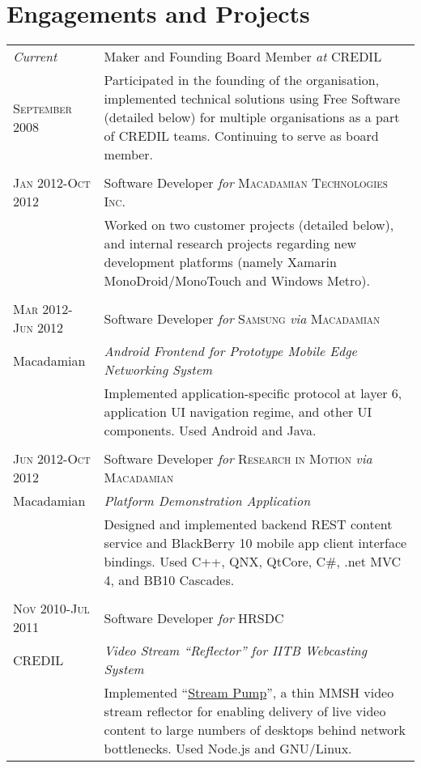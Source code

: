 \documentclass[letterpaper,10pt]{article}
\begin{document}
\section{Engagements and Projects}
\begin{longtable}{p{3cm}|p{12cm}}
  \emph{Current} & Maker and Founding Board Member \emph{at} \textsc{CREDIL} \\
  \textsc{September 2008} & \footnotesize{Participated in the founding of the organisation, implemented technical solutions using Free Software (detailed below) for multiple organisations as a part of CREDIL teams.  Continuing to serve as board member.} \\
\multicolumn{2}{c}{} \\
  \textsc{Jan 2012-Oct 2012} & Software Developer \emph{for} \textsc{Macadamian Technologies Inc.} \\
   & \footnotesize{Worked on two customer projects (detailed below), and internal research projects regarding new development platforms (namely Xamarin MonoDroid/MonoTouch and Windows Metro).} \\
\multicolumn{2}{c}{} \\
  \textsc{Mar 2012-Jun 2012} & Software Developer \emph{for} \textsc{Samsung} \emph{via} \textsc{Macadamian} \\
  \tiny{Macadamian} & \emph{Android Frontend for Prototype Mobile Edge Networking System} \\
   & \footnotesize{Implemented application-specific protocol at layer 6, application UI navigation regime, and other UI components.  Used Android and Java.} \\
\multicolumn{2}{c}{} \\
  \textsc{Jun 2012-Oct 2012} & Software Developer \emph{for} \textsc{Research in Motion} \emph{via} \textsc{Macadamian} \\
  \tiny{Macadamian} & \emph{Platform Demonstration Application} \\
   & \footnotesize{Designed and implemented backend REST content service and BlackBerry 10 mobile app client interface bindings.  Used C++, QNX, QtCore, C\#, .net MVC 4, and BB10 Cascades.} \\
\pagebreak
\multicolumn{2}{c}{} \\
  \textsc{Nov 2010-Jul 2011} & Software Developer \emph{for} \textsc{HRSDC} \\
  \tiny{CREDIL} & \emph{Video Stream ``Reflector'' for IITB Webcasting System} \\
   & \footnotesize{Implemented ``{\href{https://github.com/orospakr/stream-pump}{Stream Pump}}'', a thin MMSH video stream reflector for enabling delivery of live video content to large numbers of desktops behind network bottlenecks.  Used Node.js and GNU/Linux.} \\

\end{longtable}
\end{document}
